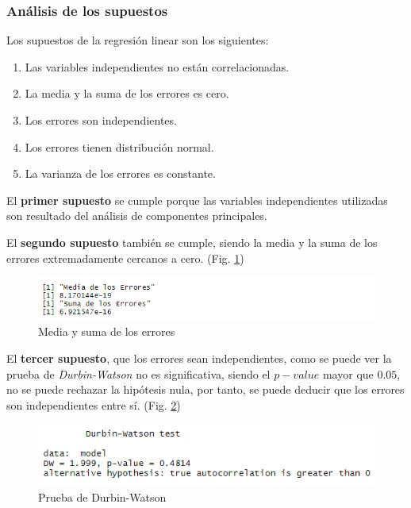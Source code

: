 \documentclass[a4paper,10pt,twocolumn]{article}
\begin{document}
\subsubsection{Análisis de los supuestos}\label{sec:reg_err}

Los supuestos de la regresión linear son los siguientes:

\begin{enumerate}
	\item Las variables independientes no están correlacionadas.
	\item La media y la suma de los errores es cero.
	\item Los errores son independientes.
	\item Los errores tienen distribución normal.
	\item La varianza de los errores es constante.
\end{enumerate}

El \textbf{primer supuesto} se cumple porque las variables independientes utilizadas son resultado del análisis de componentes principales.

El \textbf{segundo supuesto} también se cumple, siendo la media y la suma de los errores extremadamente cercanos a cero. (Fig. \ref{fig:reg_mean_sum})

\begin{figure}[htb]%
	\begin{center}
		\includegraphics[width=\linewidth]{reg_mean_sum}
	\end{center}
	\caption{Media y suma de los errores \label{fig:reg_mean_sum}}%
\end{figure}

El \textbf{tercer supuesto}, que los errores sean independientes, como se puede ver la prueba de \textit{Durbin-Watson} no es significativa, siendo el $p-value$ mayor que $0.05$, no se puede rechazar la hipótesis nula, por tanto, se puede deducir que los errores son independientes entre sí. (Fig. \ref{fig:reg_dwtest})

\begin{figure}[htb]%
	\begin{center}
		\includegraphics[width=\linewidth]{reg_dwtest}
	\end{center}
	\caption{Prueba de Durbin-Watson \label{fig:reg_dwtest}}%
\end{figure}
\end{document}
